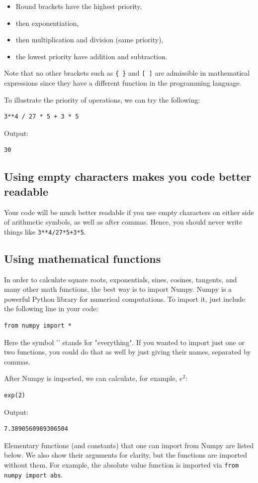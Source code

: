 \begin{itemize} 
\item Round brackets have the highest priority,
\item then exponentiation, 
\item then multiplication and division (same priority),
\item the lowest priority have addition and subtraction.
\end{itemize}
Note that no other brackets such as {\tt \{ \}} and {\tt [ ]} are 
admissible in mathematical expressions since they have a different 
function in the programming language.

To illustrate the priority of operations, we can try the following:

\begin{verbatim}
3**4 / 27 * 5 + 3 * 5
\end{verbatim}
Output:

\begin{verbatim}
30
\end{verbatim}
\subsection{Using empty characters makes you code better readable}
Your code will be much better readable if you use empty
characters on either side of arithmetic symbols, as well as 
after commas. Hence, you should never write things like {\tt 3**4/27*5+3*5}.

\subsection{Using mathematical functions}

In order to calculate square roots, exponentials, sines, cosines, tangents, and many other 
math functions, the best way is to import Numpy. Numpy is a powerful Python library 
for numerical computations. To import it, just include the following 
line in your code:

\begin{verbatim}
from numpy import *
\end{verbatim}
Here the symbol '{\tt *}' stands for "everything". If you wanted to import just one or two 
functions, you could do that as well by just giving their names, separated by commas. 

After Numpy is imported, we can calculate, for example, $e^2$:

\begin{verbatim}
exp(2)
\end{verbatim}
Output:
\begin{verbatim}
7.3890560989306504
\end{verbatim}
Elementary functions (and constants) that one can import from Numpy are listed
below. We also show their arguments for clarity, but the functions are imported without 
them. For example, the absolute value function is imported via {\tt from numpy import abs}.\\

